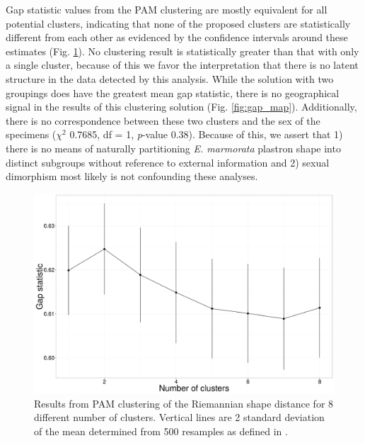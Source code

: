 \documentclass[12pt,letterpaper]{article}
\begin{document}
Gap statistic values from the PAM clustering are mostly equivalent for all potential clusters, indicating that none of the proposed clusters are statistically different from each other as evidenced by the confidence intervals around these estimates (Fig. \ref{fig:gap}). No clustering result is statistically greater than that with only a single cluster, because of this we favor the interpretation that there is no latent structure in the data detected by this analysis. While the solution with two groupings does have the greatest mean gap statistic, there is no geographical signal in the results of this clustering solution (Fig. \ref{fig:gap_map}). Additionally, there is no correspondence between these two clusters and the sex of the specimens (\(\chi^{2}\) 0.7685, df = 1, \textit{p}-value 0.38). Because of this, we assert that 1) there is no means of naturally partitioning \textit{E. marmorata} plastron shape into distinct subgroups without reference to external information and 2) sexual dimorphism most likely is not confounding these analyses.

\begin{figure}[h]
  \centering
  \includegraphics[height = 0.5\textheight, width = \textwidth, keepaspectratio = true]{figure/gap_res}
  \caption{Results from PAM clustering of the Riemannian shape distance for 8 different number of clusters. Vertical lines are 2 standard deviation of the mean determined from 500 resamples as defined in \citep{Tibshirani2001a}.}
  \label{fig:gap}
\end{figure}
\end{document}
